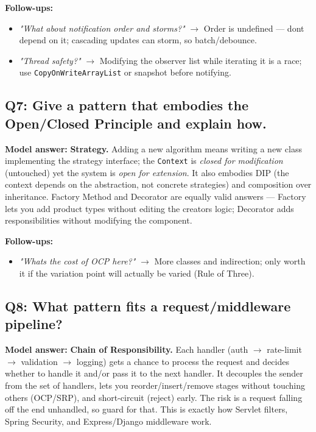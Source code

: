 \documentclass[11pt]{article}
\providecommand{\tightlist}{\setlength{\itemsep}{1pt}\setlength{\parskip}{0pt}}
\begin{document}
\textbf{Follow-ups:}

\begin{itemize}
\tightlist
\item
  \emph{"What about notification order and storms?"} \(\rightarrow\) Order is undefined --- don\textquotesingle t depend on it; cascading updates can storm, so batch/debounce.
\item
  \emph{"Thread safety?"} \(\rightarrow\) Modifying the observer list while iterating it is a race; use \texttt{CopyOnWriteArrayList} or snapshot before notifying.
\end{itemize}

\subsection{Q7: Give a pattern that embodies the Open/Closed Principle and explain how.}\label{q7-give-a-pattern-that-embodies-the-openclosed-principle-and-explain-how}

\textbf{Model answer:} \textbf{Strategy.} Adding a new algorithm means writing a new class implementing the strategy interface; the \texttt{Context} is \emph{closed for modification} (untouched) yet the system is \emph{open for extension}. It also embodies DIP (the context depends on the abstraction, not concrete strategies) and composition over inheritance. Factory Method and Decorator are equally valid answers --- Factory lets you add product types without editing the creator\textquotesingle s logic; Decorator adds responsibilities without modifying the component.

\textbf{Follow-ups:}

\begin{itemize}
\tightlist
\item
  \emph{"What\textquotesingle s the cost of OCP here?"} \(\rightarrow\) More classes and indirection; only worth it if the variation point will actually be varied (Rule of Three).
\end{itemize}

\subsection{Q8: What pattern fits a request/middleware pipeline?}\label{q8-what-pattern-fits-a-requestmiddleware-pipeline}

\textbf{Model answer:} \textbf{Chain of Responsibility.} Each handler (auth \(\rightarrow\) rate-limit \(\rightarrow\) validation \(\rightarrow\) logging) gets a chance to process the request and decides whether to handle it and/or pass it to the next handler. It decouples the sender from the set of handlers, lets you reorder/insert/remove stages without touching others (OCP/SRP), and short-circuit (reject) early. The risk is a request falling off the end unhandled, so guard for that. This is exactly how Servlet filters, Spring Security, and Express/Django middleware work.
\end{document}
